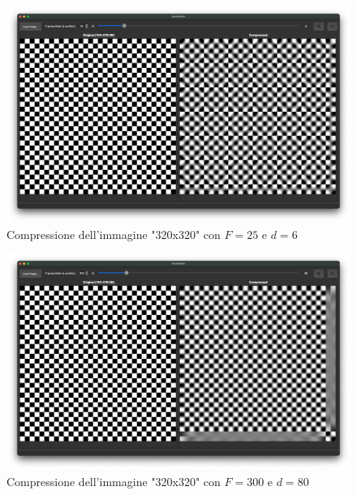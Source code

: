 \begin{figure}
	\centering
	\includegraphics[width=0.7\linewidth]{figures/border_small}
	\caption{Compressione dell'immagine "320x320" con $F=25$ e $d=6$}
	\label{fig:border_small}
\end{figure}

\begin{figure}
	\centering
	\includegraphics[width=0.7\linewidth]{figures/border_big}
	
	\caption{Compressione dell'immagine "320x320" con $F=300$ e $d=80$}
	\label{fig:border_big}
\end{figure}